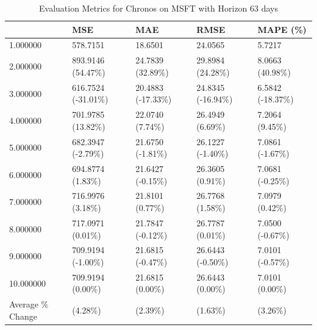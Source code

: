 \begin{table}
\caption{Evaluation Metrics for Chronos on MSFT with Horizon 63 days}
\label{tab:chronos_base_MSFT_h63_metrics}
\begin{tabular}{lllll}
\toprule
 & MSE & MAE & RMSE & MAPE (\%) \\
\midrule
1.000000 & 578.7151 & 18.6501 & 24.0565 & 5.7217 \\
2.000000 & 893.9146 (54.47\%) & 24.7839 (32.89\%) & 29.8984 (24.28\%) & 8.0663 (40.98\%) \\
3.000000 & 616.7524 (-31.01\%) & 20.4883 (-17.33\%) & 24.8345 (-16.94\%) & 6.5842 (-18.37\%) \\
4.000000 & 701.9785 (13.82\%) & 22.0740 (7.74\%) & 26.4949 (6.69\%) & 7.2064 (9.45\%) \\
5.000000 & 682.3947 (-2.79\%) & 21.6750 (-1.81\%) & 26.1227 (-1.40\%) & 7.0861 (-1.67\%) \\
6.000000 & 694.8774 (1.83\%) & 21.6427 (-0.15\%) & 26.3605 (0.91\%) & 7.0681 (-0.25\%) \\
7.000000 & 716.9976 (3.18\%) & 21.8101 (0.77\%) & 26.7768 (1.58\%) & 7.0979 (0.42\%) \\
8.000000 & 717.0971 (0.01\%) & 21.7847 (-0.12\%) & 26.7787 (0.01\%) & 7.0500 (-0.67\%) \\
9.000000 & 709.9194 (-1.00\%) & 21.6815 (-0.47\%) & 26.6443 (-0.50\%) & 7.0101 (-0.57\%) \\
10.000000 & 709.9194 (0.00\%) & 21.6815 (0.00\%) & 26.6443 (0.00\%) & 7.0101 (0.00\%) \\
Average \% Change & (4.28\%) & (2.39\%) & (1.63\%) & (3.26\%) \\
\bottomrule
\end{tabular}
\end{table}

